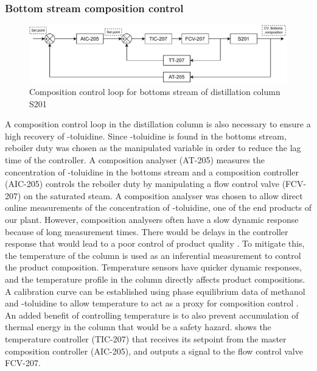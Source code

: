 \subsubsection{Bottom stream composition control} %
    \begin{figure}
        \centering
        \includegraphics[width=\linewidth]{chapters/4-operation-control/4-Figures/S201-CC.pdf}
        \caption{Composition control loop for bottoms stream of distillation column S201}
        \label{fig:S201-CC}
    \end{figure}
A composition control loop in the distillation column is also necessary to ensure a high recovery of \ortho-toluidine. Since \ortho-toluidine is found in the bottoms stream, reboiler duty was chosen as the manipulated variable in order to reduce the lag time of the controller. A composition analyser (AT-205) measures the concentration of \ortho-toluidine in the bottoms stream and a composition controller (AIC-205) controls the reboiler duty by manipulating a flow control valve (FCV-207) on the saturated steam. 
A composition analyser was chosen to allow direct online measurements of the concentration of \ortho-toluidine, one of the end products of our plant. However, composition analysers often have a slow dynamic response because of long measurement times. There would be delays in the controller response that would lead to a poor control of product quality \cite{kister_distillation_1990}. To mitigate this, the temperature of the column is used as an inferential measurement to control the product composition. Temperature sensors have quicker dynamic responses, and the temperature profile in the column directly affects product compositions. A calibration curve can be established using phase equilibrium data of methanol and \ortho-toluidine to allow temperature to act as a proxy for composition control \cite{kister_distillation_1990}. An added benefit of controlling temperature is to also prevent accumulation of thermal energy in the column that would be a safety hazard.  shows the temperature controller (TIC-207) that receives its setpoint from the master composition controller (AIC-205), and outputs a signal to the flow control valve FCV-207.

